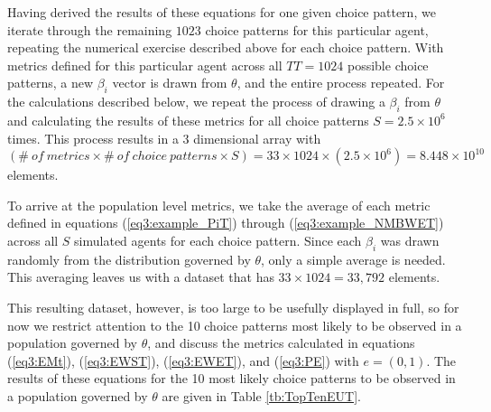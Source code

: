 \documentclass[../main.tex]{subfiles}
\begin{document}
Having derived the results of these equations for one given choice pattern, we iterate through the remaining $1023$ choice patterns for this particular agent, repeating the numerical exercise described above for each choice pattern.
With metrics defined for this particular agent across all $TT = 1024$ possible choice patterns, a new $\beta_i$ vector is drawn from $\theta$, and the entire process repeated.
For the calculations described below, we repeat the process of drawing a $\beta_i$ from $\theta$ and calculating the results of these metrics for all choice patterns $S = 2.5 \times 10^6$ times.
This process results in a $3$ dimensional array with $(\mathit{\#\ of\ metrics} \times \mathit{\#\ of\ choice\ patterns} \times S) = 33 \times 1024 \times (2.5 \times 10^6) = 8.448 \times 10^{10}$ elements.

To arrive at the population level metrics, we take the average of each metric defined in equations (\ref{eq3:example_PiT}) through (\ref{eq3:example_NMBWET}) across all $S$ simulated agents for each choice pattern.
Since each $\beta_i$ was drawn randomly from the distribution governed by $\theta$, only a simple average is needed.
This averaging leaves us with a dataset that has $33 \times 1024 = 33,792$ elements.

This resulting dataset, however, is too large to be usefully displayed in full, so for now we restrict attention to the 10 choice patterns most likely to be observed in a population governed by $\theta$, and discuss the metrics calculated in equations (\ref{eq3:EMt}), (\ref{eq3:EWST}), (\ref{eq3:EWET}), and (\ref{eq3:PE}) with $e = (0,1)$.
The results of these equations for the 10 most likely choice patterns to be observed in a population governed by $\theta$ are given in Table \ref{tb:TopTenEUT}.
\end{document}
